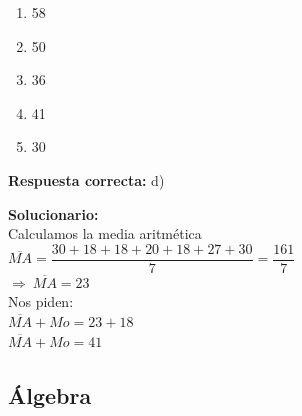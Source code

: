 \begin{enumerate}
	\begin{enumerate}[label=\alph*)]
		\item 58
		\item 50
		\item 36
		\item 41
		\item 30
	\end{enumerate}
	
	\textbf{Respuesta correcta:} d)
	
	\vspace{2mm}
	\textbf{Solucionario:}\\
	
	Calculamos la media aritmética\\
	
	$\overline{MA}=\dfrac{30+18+18+20+18+27+30}{7}=\dfrac{161}{7}$\\
	$\Rightarrow\ \overline{MA}=23$\\
	
	Nos piden:\\
	
	$\overline{MA}+Mo=23+18$\\
	$\overline{MA}+Mo=41$	
	
	
	
\end{enumerate}











\subsection*{Álgebra}

